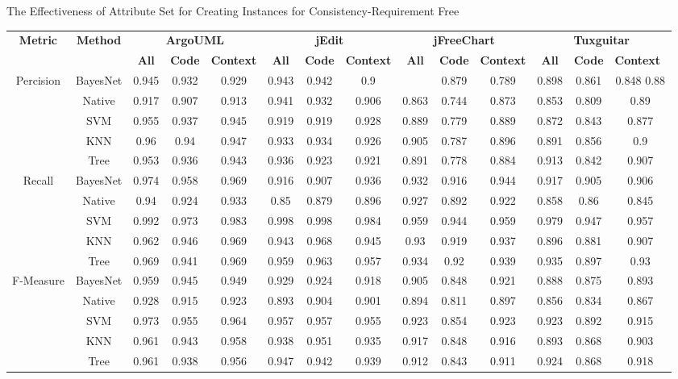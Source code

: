 {\begin{table*}[htbp]
\scriptsize
{The Effectiveness of Attribute Set for Creating Instances for Consistency-Requirement Free}
\vspace{0.5em}
\centering
\begin{tabular}{cccccccccccccc}
\toprule[1.5pt]
\multirow{2}{*}{\textbf{Metric}}&\multirow{2}{*}{\textbf{Method}}&\multicolumn{3}{c}{\textbf{ArgoUML}}&\multicolumn{3}{c}{\textbf{jEdit}}&\multicolumn{3}{c}{\textbf{jFreeChart}}&\multicolumn{3}{c}{\textbf{Tuxguitar}}\\
\cline{3-14}
&&\textbf{All}&\textbf{Code}&\textbf{Context}&\textbf{All}&\textbf{Code}&\textbf{Context}&\textbf{All}&\textbf{Code}&\textbf{Context}&\textbf{All}&\textbf{Code}&\textbf{Context}~\\
\midrule[1pt]
\multirow{5}{*}{Percision}
&BayesNet&0.945&	0.932	&0.929&		0.943&	0.942	&0.9	&	&0.879	&0.789	&0.898		&0.861	&0.848	0.88\\
&Native&0.917	&0.907&	0.913	&	0.941	&0.932&	0.906	&	0.863&	0.744&	0.873	&	0.853&	0.809	&0.89\\
&SVM&0.955&	0.937	&0.945	&	0.919	&0.919&	0.928&		0.889	&0.779&	0.889	&	0.872	&0.843	&0.877\\
&KNN&0.96	&0.94	&0.947	&	0.933&	0.934	&0.926	&	0.905&	0.787&	0.896	&	0.891&	0.856&	0.9\\
&Tree&0.953&	0.936	&0.943	&	0.936&	0.923	&0.921&		0.891&	0.778&	0.884	&	0.913	&0.842&	0.907\\

\hline
\multirow{5}{*}{Recall}
&BayesNet&0.974	&0.958	&0.969	&	0.916	&0.907&	0.936		&0.932	&0.916	&0.944	&	0.917	&0.905	&0.906\\
&Native&0.94	&0.924	&0.933&		0.85	&0.879&	0.896		&0.927&	0.892	&0.922	&	0.858	&0.86&	0.845\\
&SVM&0.992	&0.973&	0.983		&0.998	&0.998&	0.984		&0.959	&0.944	&0.959		&0.979	&0.947	&0.957\\
&KNN&0.962&	0.946&	0.969	&	0.943	&0.968&	0.945		&0.93&	0.919&	0.937	&	0.896	&0.881&	0.907\\
&Tree&0.969&	0.941	&0.969	&	0.959&	0.963	&0.957	&	0.934	&0.92&	0.939	&	0.935	&0.897	&0.93\\
\hline
\multirow{5}{*}{F-Measure}
&BayesNet&0.959&	0.945&	0.949	&	0.929	&0.924&	0.918	&	0.905&	0.848	&0.921	&	0.888&	0.875&	0.893\\
&Native&0.928&	0.915	&0.923	&0.893	&0.904	&0.901		&0.894&	0.811&	0.897	&	0.856	&0.834	&0.867\\
&SVM&0.973&	0.955&	0.964	&	0.957&	0.957&	0.955	&	0.923&	0.854	&0.923&		0.923&	0.892&	0.915\\
&KNN&0.961&	0.943&	0.958	&	0.938	&0.951&	0.935		&0.917	&0.848	&0.916&		0.893&	0.868	&0.903\\
&Tree&0.961&	0.938&	0.956	&	0.947	&0.942&	0.939	&	0.912&	0.843	&0.911&		0.924	&0.868&	0.918\\
\bottomrule[1.5pt]
\end{tabular}
\end{table*}


}
